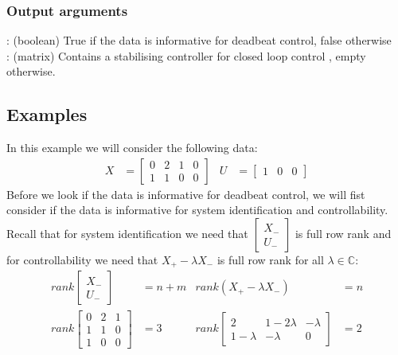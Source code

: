 \subsubsection*{Output arguments}
\textbf{}: (boolean) True if the data is informative for deadbeat control, false otherwise\\
\textbf{}: (matrix) Contains a stabilising controller  for closed loop control , empty otherwise.

\subsection{Examples}
In this example we will consider the following data:
\begin{align*} X &= \begin{bmatrix} 0&2&1&0\\1&1&0&0 \end{bmatrix} & U &= \begin{bmatrix} 1&0&0 \end{bmatrix}\end{align*} 
Before we look if the data is informative for deadbeat control, we will fist consider if the data is informative for system identification and controllability. Recall that for system identification we need that $\begin{bmatrix} X_- \\ U_- \end{bmatrix}$ is full row rank and for controllability we need that $X_+ - \lambda X_-$ is full row rank for all $\lambda \in \mathbb{C}$:
\begin{align*}
rank\begin{bmatrix} X_- \\ U_- \end{bmatrix} &= n + m & rank(X_+ - \lambda X_-) &= n \\
rank\begin{bmatrix} 0&2&1\\1&1&0\\1&0&0 \end{bmatrix} &= 3 & rank\begin{bmatrix} 2&1 - 2\lambda &-\lambda\\1-\lambda&-\lambda&0 \end{bmatrix} &= 2
\end{align*}

